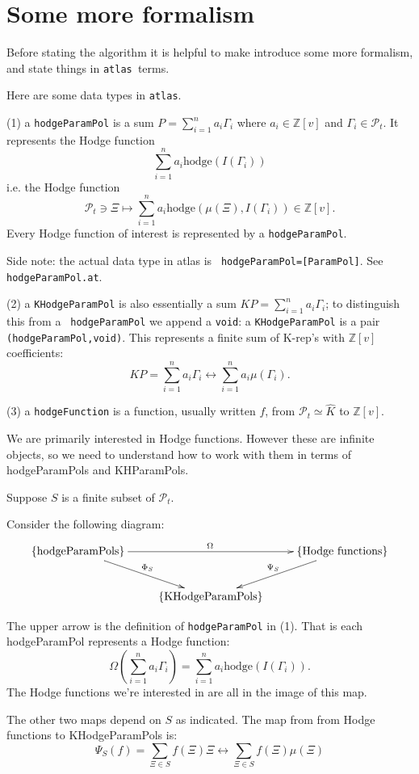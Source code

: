 \documentclass[12pt,leqno]{article}
\newcommand{\hodge}{\text{hodge}}
\newcommand\Pt{\mathcal P_t}
\newcommand{\krep}{K-rep}
\newcommand{\Z}{\mathbb Z}
\renewcommand{\sec}[1]{\section{#1}
\renewcommand{\theequation}{\thesection.\arabic{equation}}
  \setcounter{equation}{0}}
\newcommand{\Khat}{\widehat K}
\newcommand{\atlas}{{\tt atlas~}}
\renewcommand{\sec}[1]{\section{#1}
\renewcommand{\theequation}{\thesection.\arabic{equation}}
  \setcounter{equation}{0}}
\begin{document}
\sec{Some more formalism}
\label{s:moreformalism}

Before stating the algorithm it is helpful to make introduce some more
formalism, and state things in \atlas terms.

Here are some data types in {\tt atlas}.

\medskip

\noindent (1) a {\tt hodgeParamPol} is a sum  $P=\sum_{i=1}^n a_i \Gamma_i$
where $a_i\in\Z[v]$ and  $\Gamma_i\in \Pt$. It represents the Hodge function
$$
\sum_{i=1}^n a_i \hodge(I(\Gamma_i))
$$
i.e. the Hodge function
$$
\Pt\ni \Xi\mapsto\sum_{i=1}^n a_i \hodge(\mu(\Xi),I(\Gamma_i))\in\Z[v].
$$
Every Hodge function of interest is represented by a {\tt hodgeParamPol}.

Side note: the actual data type in atlas is {\tt
hodgeParamPol=[ParamPol]}. See {\tt hodgeParamPol.at}.  \smallskip

\noindent (2) a {\tt KHodgeParamPol} is also essentially a sum
$KP=\sum_{i=1}^n a_i \Gamma_i$; to distinguish this from a {\tt
  hodgeParamPol} we append a {\tt void}: a {\tt KHodgeParamPol} is a
pair {\tt (hodgeParamPol,void)}.
This represents a finite sum of \krep's with $\Z[v]$ coefficients:
$$
KP=\sum_{i=1}^na_i\Gamma_i\longleftrightarrow\sum_{i=1}^n a_i\mu(\Gamma_i).
$$


\smallskip

\noindent (3) a {\tt hodgeFunction} is a function, usually written $f$,  from $\Pt\simeq\Khat$ to $\Z[v]$.

\medskip We are primarily interested in Hodge functions. However these
are infinite objects, so we need to understand how to work with them in terms of
hodgeParamPols and KHParamPols.

Suppose $S$ is a finite subset of $\Pt$.

Consider the following diagram:
$$
\xymatrix{
\{\text{hodgeParamPols}\}\ar@{->}^{\Omega}[rr]\ar@{->}^{\Phi_S}[dr]&&
\ar@{->}_{\Psi_S}[dl]\{\text{Hodge functions}\}\\
&\{\text{KHodgeParamPols}\}
}
$$

The upper arrow is the definition of {\tt hodgeParamPol} in (1). That is each
hodgeParamPol represents a Hodge function:
$$
\Omega(\sum_{i=1}^n a_i\Gamma_i)=\sum_{i=1}^n a_i\hodge(I(\Gamma_i)).
$$
The Hodge functions we're
interested in are all in the image of this map.

The other two maps depend on $S$ as indicated.
The map from  from Hodge functions to KHodgeParamPols is:
$$
\Psi_S(f)=\sum_{\Xi\in S}f(\Xi)\Xi\longleftrightarrow \sum_{\Xi\in S}f(\Xi)\mu(\Xi)
$$
\end{document}
